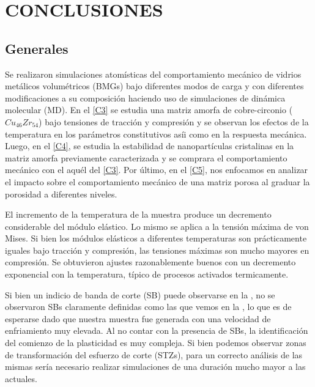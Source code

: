 
\chapter{CONCLUSIONES} %

\label{C6} %



\section{Generales}

Se realizaron simulaciones atomísticas del comportamiento mecánico de vidrios metálicos volumétricos (BMGs) bajo diferentes modos de carga y con diferentes modificaciones a su composición haciendo uso de simulaciones de dinámica molecular (MD). En el \cref{C3} se estudia una matriz amorfa de cobre-circonio ($Cu_{46}Zr_{54}$) bajo tensiones de tracción y compresión y se observan los efectos de la temperatura en los parámetros constitutivos asíi como en la respuesta mecánica. Luego, en el \cref{C4}, se estudia la estabilidad de nanopartículas cristalinas en la matriz amorfa previamente caracterizada y se comprara el comportamiento mecánico con el aquél del \cref{C3}. Por último, en el \cref{C5}, nos enfocamos en analizar el impacto sobre el comportamiento mecánico de una matriz porosa al graduar la porosidad a diferentes niveles.

El incremento de la temperatura de la muestra produce un decremento considerable del módulo elástico. Lo mismo se aplica a la tensión máxima de von Mises. Si bien los módulos elásticos a diferentes temperaturas son prácticamente iguales bajo tracción y compresión, las tensiones máximas son mucho mayores en compresión. Se obtuvieron ajustes razonablemente buenos con un decremento exponencial con la temperatura, típico de procesos activados termicamente.

Si bien un indicio de banda de corte (SB) puede observarse en la , no se observaron SBs claramente definidas como las que vemos en la , lo que es de esperarse dado que nuestra muestra fue generada con una velocidad de enfriamiento muy elevada. Al no contar con la presencia de SBs, la identificación del comienzo de la plasticidad es muy compleja. Si bien podemos observar zonas de transformación del esfuerzo de corte (STZs), para un correcto análisis de las mismas sería necesario realizar simulaciones de una duración mucho mayor a las actuales.


